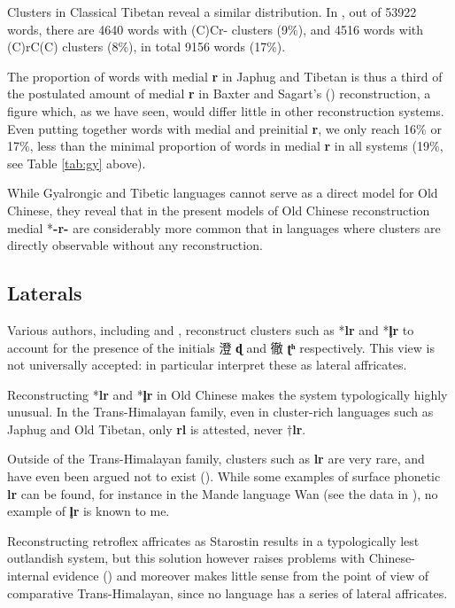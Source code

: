 \documentclass[oneside,a4paper,11pt]{article}
\newcommand{\ipa}[1]{{\phon\mbox{\textbf{#1}}}}
\newcommand{\zh}[1]{{\cn #1}}
\begin{document}
Clusters in Classical Tibetan reveal a similar distribution. In \citet{bodrgya}, out of 53922 words, there are 4640 words with (C)Cr- clusters (9\%), and 4516 words with (C)rC(C) clusters (8\%), in total 9156 words (17\%). 

The proportion of words with medial \ipa{r} in Japhug and Tibetan is thus a third of the postulated amount of medial \ipa{r} in Baxter and Sagart's (\citeyear{bs14oc}) reconstruction, a figure which, as we have seen, would differ little in other reconstruction systems. Even putting together words with medial and preinitial \ipa{r}, we only reach 16\% or 17\%, less than the minimal proportion of words in medial \ipa{r} in all systems (19\%, see Table \ref{tab:gy} above). 

While Gyalrongic and Tibetic languages cannot serve as a direct model for Old Chinese, they reveal that in the present models of Old Chinese reconstruction medial *\ipa{-r-} are considerably more common that in languages where clusters are directly observable without any reconstruction.

\subsection{Laterals}
Various authors, including \citet{schuessler09minimal} and \citet{bs14oc}, reconstruct clusters such as *\ipa{lr} and *\ipa{l̥r} to account for the presence of the initials \zh{澄} \ipa{ɖ} and \zh{徹} \ipa{ʈʰ} respectively. This view is not universally accepted: \citet[217-225]{starostin89} in particular interpret these as lateral affricates.

Reconstructing *\ipa{lr} and *\ipa{l̥r} in Old Chinese makes the system typologically highly unusual. In the Trans-Himalayan family, even in cluster-rich languages such as Japhug and Old Tibetan, only \ipa{rl} is attested, never $\dagger$\ipa{lr}.

Outside of the Trans-Himalayan family, clusters such as \ipa{lr} are very rare, and have even been argued not to exist (\citealt[78]{baroni14invariant}). While some examples of surface phonetic \ipa{lr} can be found, for instance in the Mande language Wan (see the data in \citealt{nikitina12logophoric}), no example of \ipa{l̥r} is known to me.

Reconstructing retroflex affricates as Starostin results in a typologically lest outlandish system, but this solution however raises problems with Chinese-internal evidence (\citealt[36-40]{sagart99roc}) and moreover makes little sense from the point of view of comparative Trans-Himalayan, since no language has a series of lateral affricates.
\end{document}
